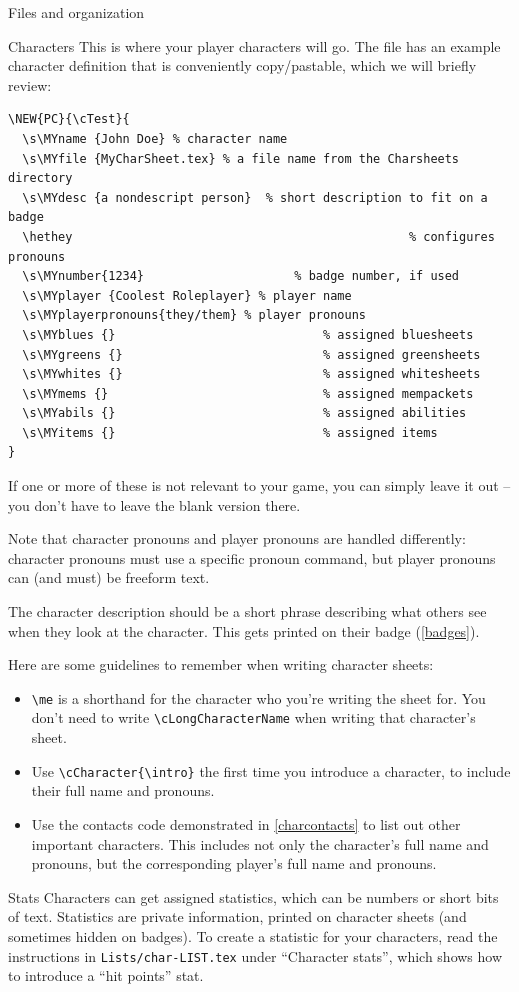 \documentclass[sheet]{GameTexBase}
\begin{document}
\begin{section}{Files and organization}
\begin{subsection}{Characters}
This is where your player characters will go.  The file has an example character definition that is conveniently copy/pastable, which we will briefly review:
\begin{verbatim}
\NEW{PC}{\cTest}{
  \s\MYname	{John Doe} % character name
  \s\MYfile {MyCharSheet.tex} % a file name from the Charsheets directory
  \s\MYdesc	{a nondescript person}  % short description to fit on a badge
  \hethey												% configures pronouns
  \s\MYnumber{1234}						% badge number, if used
  \s\MYplayer {Coolest Roleplayer} % player name
  \s\MYplayerpronouns{they/them} % player pronouns
  \s\MYblues {}								% assigned bluesheets
  \s\MYgreens {}							% assigned greensheets
  \s\MYwhites {}							% assigned whitesheets
  \s\MYmems {}								% assigned mempackets
  \s\MYabils {}								% assigned abilities
  \s\MYitems {}								% assigned items
}
\end{verbatim}
If one or more of these is not relevant to your game, you can simply leave it out -- you don't have to leave the blank version there.

Note that character pronouns and player pronouns are handled differently: character pronouns must use a specific pronoun command, but player pronouns can (and must) be freeform text.

The character description should be a short phrase describing what others see when they look at the character.  This gets printed on their badge (\ref{badges}).

Here are some guidelines to remember when writing character sheets:
\begin{itemize}
\item \lstinline|\me| is a shorthand for the character who you're writing the sheet for.  You don't need to write \lstinline|\cLongCharacterName| when writing that character's sheet.
\item Use \lstinline|\cCharacter{\intro}| the first time you introduce a character, to include their full name and pronouns.
\item Use the contacts code demonstrated in \ref{charcontacts} to list out other important characters.  This includes not only the character's full name and pronouns, but the corresponding player's full name and pronouns.
\end{itemize}
\begin{subsubsection}{Stats}
Characters can get assigned statistics, which can be numbers or short bits of text.  Statistics are private information, printed on character sheets (and sometimes hidden on badges).  To create a statistic for your characters, read the instructions in \lstinline|Lists/char-LIST.tex| under ``Character stats'', which shows how to introduce a ``hit points'' stat.


\end{subsubsection}
\end{subsection}
\end{section}
\end{document}
